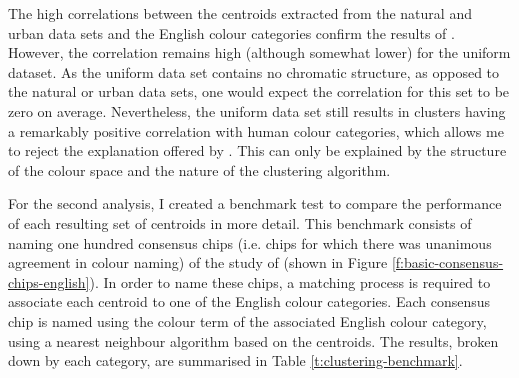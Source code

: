 The high correlations between the centroids extracted from the natural
and urban data sets and the English colour categories
\citep{sturges95location} confirm the results of
\citeauthor{yendrikhovskij01computational}. However, the correlation
remains high (although somewhat lower) for the uniform dataset. As the
uniform data set contains no chromatic structure, as opposed to the
natural or urban data sets, one would expect the correlation for this
set to be zero on average. Nevertheless, the uniform data set still
results in clusters having a remarkably positive correlation with
human colour categories, which allows me to reject the explanation
offered by \citeauthor{yendrikhovskij01computational}. This can only
be explained by the structure of the colour space and the nature of
the clustering algorithm.

For the second analysis, I created a benchmark test to compare the
performance of each resulting set of centroids in more detail. This
benchmark consists of naming one hundred consensus chips (i.e. chips
for which there was unanimous agreement in colour naming) of the study
of \citeauthor{sturges95location} (shown in Figure
\ref{f:basic-consensus-chips-english}). In order to name these chips,
a matching process is required to associate each centroid to one of
the English colour categories. Each consensus chip is named using the
colour term of the associated English colour category, using a
nearest neighbour algorithm based on the centroids. The results,
broken down by each category, are summarised in Table
\ref{t:clustering-benchmark}.


